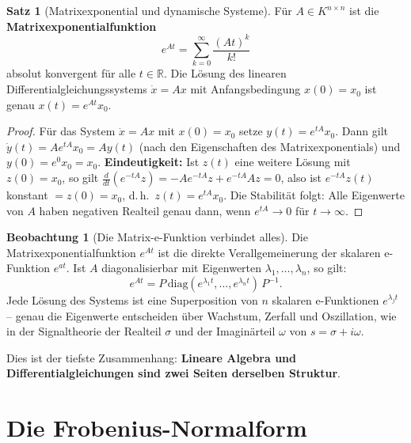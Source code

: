 ﻿\documentclass[a4paper,12pt]{report}
\theoremstyle{definition}
\newtheorem{satz}{Satz}
\newtheorem{beobachtung}{Beobachtung}
\begin{document}
\begin{satz}[Matrixexponential und dynamische Systeme]
    Für $A \in K^{n \times n}$ ist die \textbf{Matrixexponentialfunktion}
    \[
        e^{At} = \sum_{k=0}^{\infty} \frac{(At)^k}{k!}
    \]
    absolut konvergent für alle $t \in \mathbb{R}$. Die Lösung des linearen
    Differentialgleichungssystems $\dot{x} = Ax$ mit Anfangsbedingung $x(0) = x_0$
    ist genau $x(t) = e^{At} x_0$.
\end{satz}
\begin{proof}
    Für das System $\dot{x} = Ax$ mit $x(0) = x_0$ setze $y(t) = e^{tA} x_0$.
    Dann gilt $\dot{y}(t) = A e^{tA} x_0 = A y(t)$ (nach den Eigenschaften
    des Matrixexponentials) und $y(0) = e^0 x_0 = x_0$.
    \textbf{Eindeutigkeit:} Ist $z(t)$ eine weitere Lösung mit $z(0) = x_0$,
    so gilt $\frac{d}{dt}(e^{-tA} z) = -A e^{-tA} z + e^{-tA} Az = 0$,
    also ist $e^{-tA} z(t)$ konstant $= z(0) = x_0$, d.\,h.\ $z(t) = e^{tA} x_0$.
    Die Stabilität folgt: Alle Eigenwerte von $A$ haben negativen Realteil
    genau dann, wenn $e^{tA} \to 0$ für $t \to \infty$.
\end{proof}


\begin{beobachtung}[Die Matrix-e-Funktion verbindet alles]
    Die Matrixexponentialfunktion $e^{At}$ ist die direkte Verallgemeinerung
    der skalaren e-Funktion $e^{at}$. Ist $A$ diagonalisierbar mit Eigenwerten
    $\lambda_1, \dots, \lambda_n$, so gilt:
    \[
        e^{At} = P \,\mathrm{diag}(e^{\lambda_1 t}, \dots, e^{\lambda_n t})\, P^{-1}.
    \]
    Jede Lösung des Systems ist eine Superposition von $n$ skalaren
    e-Funktionen $e^{\lambda_j t}$ -- genau die Eigenwerte entscheiden
    über Wachstum, Zerfall und Oszillation, wie in der Signaltheorie der
    Realteil $\sigma$ und der Imaginärteil $\omega$ von $s = \sigma + i\omega$.

    Dies ist der tiefste Zusammenhang: \textbf{Lineare Algebra und
    Differentialgleichungen sind zwei Seiten derselben Struktur}.
\end{beobachtung}


\section{Die Frobenius-Normalform}
\end{document}
